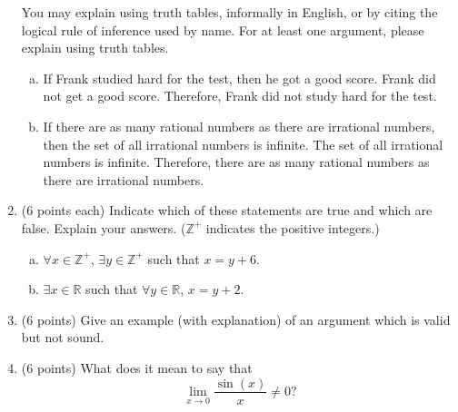 \documentclass[12pt]{article}
\begin{document}
\begin{enumerate}[1.]
You may explain using truth tables, informally in English, or by citing the logical rule of inference
used by name. For at least one argument, please explain using truth tables.
\begin{enumerate}[(a)]
\item
If Frank studied hard for the test, then he got a good score.
Frank did not get a good score.
Therefore, Frank did not study hard for the test.
\item
If there are as many rational numbers as there are irrational numbers,
then the set of all irrational numbers is infinite.
The set of all irrational numbers is infinite.
Therefore, there are as many rational numbers as there are irrational numbers.
\end{enumerate}

\item(6 points each)
Indicate which of these statements are true and which are false. 
Explain your answers. ($\mathbb{Z}^+$ indicates the positive integers.)
\begin{enumerate}[(a)]
\item
$\forall x \in \mathbb{Z}^+$, $\exists y \in \mathbb{Z}^+$ such that $x = y + 6$.
\item
$\exists x \in \mathbb{R}$ such that $\forall y \in \mathbb{R}$, $x = y + 2.$
\end{enumerate}

\item(6 points)
Give an example (with explanation) of an argument which is valid but not sound.

\item(6 points)
What does it mean to say that
$$\lim_{x \rightarrow 0} \frac{\sin(x)}{x} \neq 0?$$
\end{enumerate}
\end{document}
